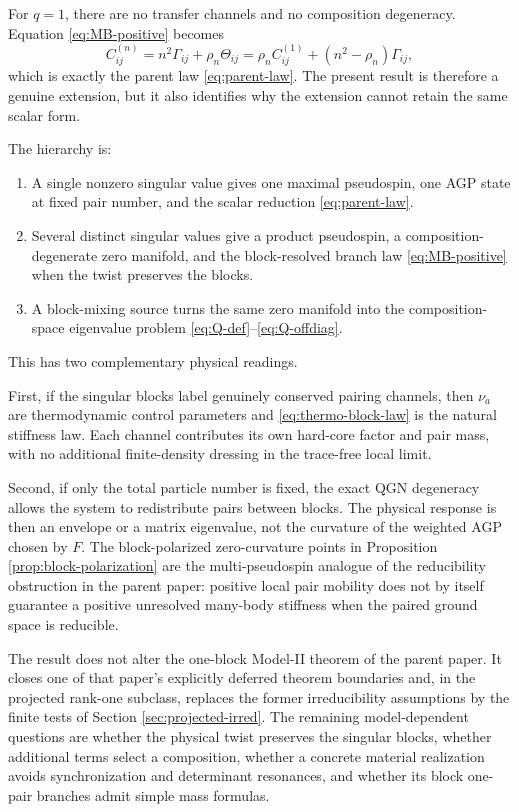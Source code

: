 \documentclass[11pt]{article}
\numberwithin{equation}{section}
\begin{document}
For $q=1$, there are no transfer channels and no composition degeneracy.  Equation \eqref{eq:MB-positive} becomes
\begin{equation}
 C_{ij}^{(n)}
 =n^2\Gamma_{ij}+\rho_n\Theta_{ij}
 =\rho_n C_{ij}^{(1)}+(n^2-\rho_n)\Gamma_{ij},
 \label{eq:recover-parent}
\end{equation}
which is exactly the parent law \eqref{eq:parent-law}.  The present result is therefore a genuine extension, but it also identifies why the extension cannot retain the same scalar form.

The hierarchy is:
\begin{enumerate}[leftmargin=2.2em]
\item A single nonzero singular value gives one maximal pseudospin, one AGP state at fixed pair number, and the scalar reduction \eqref{eq:parent-law}.
\item Several distinct singular values give a product pseudospin, a composition-degenerate zero manifold, and the block-resolved branch law \eqref{eq:MB-positive} when the twist preserves the blocks.
\item A block-mixing source turns the same zero manifold into the composition-space eigenvalue problem \eqref{eq:Q-def}--\eqref{eq:Q-offdiag}.
\end{enumerate}

This has two complementary physical readings.

First, if the singular blocks label genuinely conserved pairing channels, then $\nu_a$ are thermodynamic control parameters and \eqref{eq:thermo-block-law} is the natural stiffness law.  Each channel contributes its own hard-core factor and pair mass, with no additional finite-density dressing in the trace-free local limit.

Second, if only the total particle number is fixed, the exact QGN degeneracy allows the system to redistribute pairs between blocks.  The physical response is then an envelope or a matrix eigenvalue, not the curvature of the weighted AGP chosen by $F$.  The block-polarized zero-curvature points in Proposition \ref{prop:block-polarization} are the multi-pseudospin analogue of the reducibility obstruction in the parent paper: positive local pair mobility does not by itself guarantee a positive unresolved many-body stiffness when the paired ground space is reducible.

The result does not alter the one-block Model-II theorem of the parent paper.  It closes one of that paper's explicitly deferred theorem boundaries and, in the projected rank-one subclass, replaces the former irreducibility assumptions by the finite tests of Section \ref{sec:projected-irred}.  The remaining model-dependent questions are whether the physical twist preserves the singular blocks, whether additional terms select a composition, whether a concrete material realization avoids synchronization and determinant resonances, and whether its block one-pair branches admit simple mass formulas.
\end{document}
